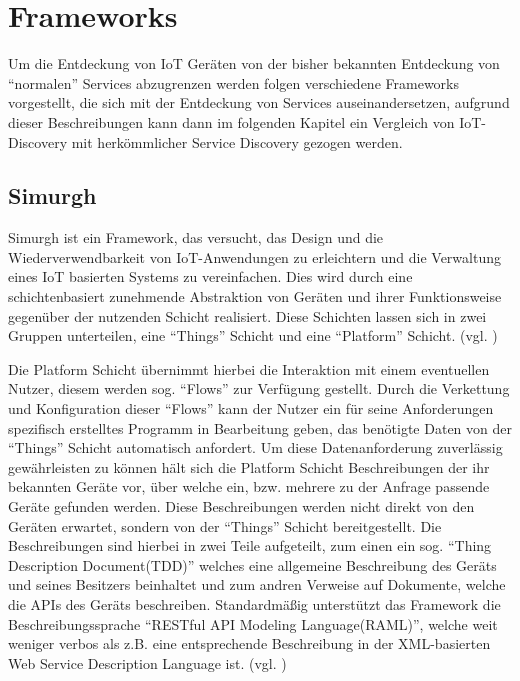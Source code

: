 \documentclass[conference,compsoc]{IEEEtran}
\begin{document}
\section{Frameworks}
Um die Entdeckung von IoT Geräten von der bisher bekannten Entdeckung von \enquote{normalen} Services abzugrenzen werden folgen verschiedene Frameworks vorgestellt, die sich mit der Entdeckung von Services auseinandersetzen, aufgrund dieser Beschreibungen kann dann im folgenden Kapitel ein Vergleich von IoT-Discovery mit herkömmlicher Service Discovery gezogen werden.

\subsection{Simurgh}

Simurgh ist ein Framework, das versucht, das Design und die Wiederverwendbarkeit von IoT-Anwendungen zu erleichtern und die Verwaltung eines IoT basierten Systems zu vereinfachen. Dies wird  durch eine schichtenbasiert zunehmende Abstraktion von Geräten und ihrer Funktionsweise gegenüber der nutzenden Schicht realisiert. Diese Schichten lassen sich in zwei Gruppen unterteilen, eine \enquote{Things} Schicht und eine \enquote{Platform} Schicht. (vgl. \cite{simurgh})

Die Platform Schicht übernimmt hierbei die Interaktion mit einem eventuellen Nutzer, diesem werden sog. \enquote{Flows} zur Verfügung gestellt. Durch die Verkettung und Konfiguration dieser \enquote{Flows} kann der Nutzer ein für seine Anforderungen spezifisch erstelltes Programm in Bearbeitung geben, das benötigte Daten von der \enquote{Things} Schicht automatisch anfordert. Um diese Datenanforderung zuverlässig gewährleisten zu können hält sich die Platform Schicht Beschreibungen der ihr bekannten Geräte vor, über welche ein, bzw. mehrere zu der Anfrage passende Geräte gefunden werden. Diese Beschreibungen werden nicht direkt von den Geräten erwartet, sondern von der \enquote{Things} Schicht bereitgestellt. Die Beschreibungen sind hierbei in zwei Teile aufgeteilt, zum einen ein sog. \enquote{Thing Description Document(TDD)} welches eine allgemeine Beschreibung des Geräts und seines Besitzers beinhaltet und zum andren Verweise auf Dokumente, welche die APIs des Geräts beschreiben. Standardmäßig unterstützt das Framework die Beschreibungssprache \enquote{RESTful API Modeling Language(RAML)}, welche weit weniger verbos als z.B. eine entsprechende Beschreibung in der XML-basierten Web Service Description Language ist. (vgl. \cite{simurgh})
\end{document}
